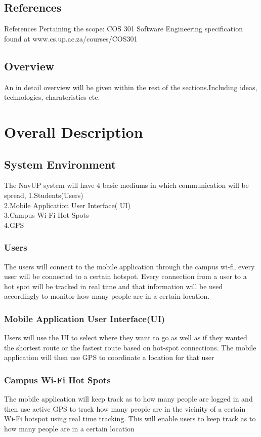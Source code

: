 \documentclass{article}
\begin{document}
\subsection{References}
References Pertaining the scope:
COS 301 Software Engineering specification found at www.cs.up.ac.za/courses/COS301
\subsection{Overview}
An in detail overview will be given within the rest of the sections.Including ideas, technologies, charateristics etc.
\newpage
\centering
\section{Overall Description}
\subsection{System Environment}
The NavUP system will have 4  basic mediums in which communication will be spread, 1.Students(Users) \\ 2.Mobile Application User Interface( UI)\\ 3.Campus Wi-Fi Hot Spots \\ 4.GPS 
\subsubsection{Users}
The users will connect to the mobile application through the campus wi-fi, every user will be connected to a certain hotspot. Every connection from a user to a hot spot will be tracked in real time and that information will be used accordingly to monitor how many people are in a certain location.
\subsubsection {Mobile Application User Interface(UI)}
Users will use the UI to select where they want to go as well as if they wanted the shortest route or the fastest route based on hot-spot connections. The mobile application will then use GPS to coordinate a location for that user
\subsubsection {Campus Wi-Fi Hot Spots}
The mobile application will keep track as to how many people are logged in and then use active GPS to track how many people are in the vicinity of a certain Wi-Fi hotspot using real time tracking. This will enable users to keep track as to how many people are in a certain location
\end{document}
